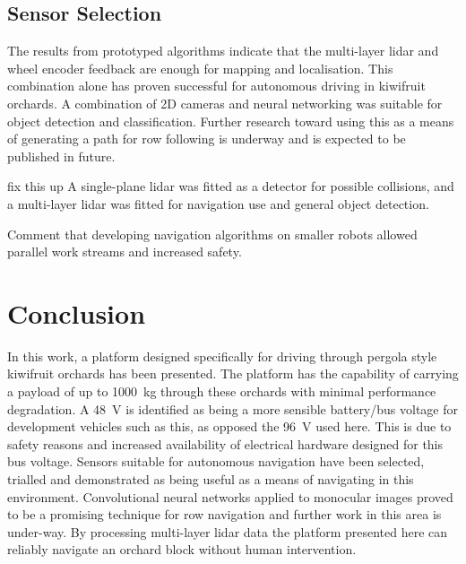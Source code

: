 \documentclass[preprint,authoryear,12pt]{elsarticle}
\begin{document}
    \subsection{Sensor Selection}
        The results from prototyped algorithms indicate that the multi-layer lidar and wheel encoder feedback are enough for mapping and localisation.
        This combination alone has proven successful for autonomous driving in kiwifruit orchards.
        A combination of 2D cameras and neural networking was suitable for object detection and classification.
        Further research toward using this as a means of generating a path for row following is underway and is expected to be published in future.

    \color{red} fix this up\color{black}
    A single-plane lidar was fitted as a detector for possible collisions, and a multi-layer lidar was fitted for navigation use and general object detection.

    Comment that developing navigation algorithms on smaller robots allowed parallel work streams and increased safety.




\section{Conclusion}
    In this work, a platform designed specifically for driving through pergola style kiwifruit orchards has been presented.
    The platform has the capability of carrying a payload of up to \SI{1000}{\kilo\gram} through these orchards with minimal performance degradation.
    A \SI{48}{\volt} is identified as being a more sensible battery/bus voltage for development vehicles such as this, as opposed the \SI{96}{\volt} used here.
    This is due to safety reasons and increased availability of electrical hardware designed for this bus voltage.
    Sensors suitable for autonomous navigation have been selected, trialled and demonstrated as being useful as a means of navigating in this environment.
    Convolutional neural networks applied to monocular images proved to be a promising technique for row navigation and further work in this area is under-way.
    By processing multi-layer lidar data the platform presented here can reliably navigate an orchard block without human intervention.
\end{document}
